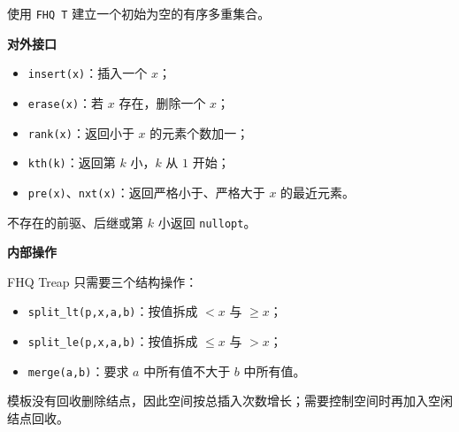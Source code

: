 使用 \texttt{FHQ T} 建立一个初始为空的有序多重集合。

\textbf{对外接口}

\begin{itemize}
  \item \texttt{insert(x)}：插入一个 $x$；
  \item \texttt{erase(x)}：若 $x$ 存在，删除一个 $x$；
  \item \texttt{rank(x)}：返回小于 $x$ 的元素个数加一；
  \item \texttt{kth(k)}：返回第 $k$ 小，$k$ 从 $1$ 开始；
  \item \texttt{pre(x)}、\texttt{nxt(x)}：返回严格小于、严格大于 $x$ 的最近元素。
\end{itemize}

不存在的前驱、后继或第 $k$ 小返回 \texttt{nullopt}。

\textbf{内部操作}

FHQ Treap 只需要三个结构操作：

\begin{itemize}
  \item \texttt{split\_lt(p,x,a,b)}：按值拆成 $<x$ 与 $\ge x$；
  \item \texttt{split\_le(p,x,a,b)}：按值拆成 $\le x$ 与 $>x$；
  \item \texttt{merge(a,b)}：要求 $a$ 中所有值不大于 $b$ 中所有值。
\end{itemize}

模板没有回收删除结点，因此空间按总插入次数增长；需要控制空间时再加入空闲结点回收。
